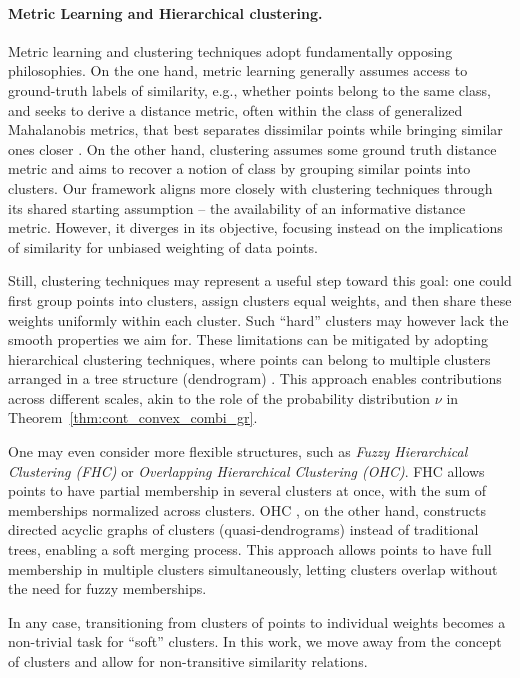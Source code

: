\paragraph{Metric Learning and Hierarchical clustering.}

Metric learning and clustering techniques adopt fundamentally opposing philosophies. On the one hand, metric learning generally assumes access to ground-truth labels of similarity, e.g., whether points belong to the same class, and seeks to derive a distance metric, often within the class of generalized Mahalanobis metrics, that best separates dissimilar points while bringing similar ones closer \cite{ghojogh_spectral_2022}. 
On the other hand, clustering assumes some ground truth distance metric and aims to recover a notion of class by grouping similar points into clusters.
Our framework aligns more closely with clustering techniques through its shared starting assumption -- the availability of an informative distance metric. However, it diverges in its objective, focusing instead on the implications of similarity for 
unbiased weighting of 
data points.


Still, clustering techniques may represent a useful step toward this goal: one could first group points into clusters, assign clusters equal weights, and then share these weights uniformly within each cluster.
Such ``hard'' clusters may however lack the smooth properties we aim for. These limitations can be mitigated by adopting hierarchical clustering techniques, where points can belong to multiple clusters arranged in a tree structure (dendrogram) \cite{murtagh_algorithms_2017,ran_comprehensive_2023}. This approach enables contributions across different scales, akin to the role of the probability distribution $\nu$  in Theorem~\ref{thm:cont_convex_combi_gr}.

One may even consider more flexible structures, such as \emph{Fuzzy Hierarchical Clustering (FHC)} or \emph{Overlapping Hierarchical Clustering (OHC)}. 
FHC \cite{varshney_pifhc_2022} 
allows points to have partial membership in several clusters at once, with the sum of memberships normalized across clusters. 
OHC \cite{berthold_overlapping_2020}, on the other hand, constructs directed acyclic graphs of clusters (quasi-dendrograms) instead of traditional trees, enabling a soft merging process. This approach allows points to have full membership in multiple clusters simultaneously, letting clusters overlap without the need for fuzzy memberships.

In any case, transitioning from clusters of points to individual weights becomes a non-trivial task for ``soft'' clusters. In this work, we move away from the concept of clusters and allow for non-transitive similarity relations.